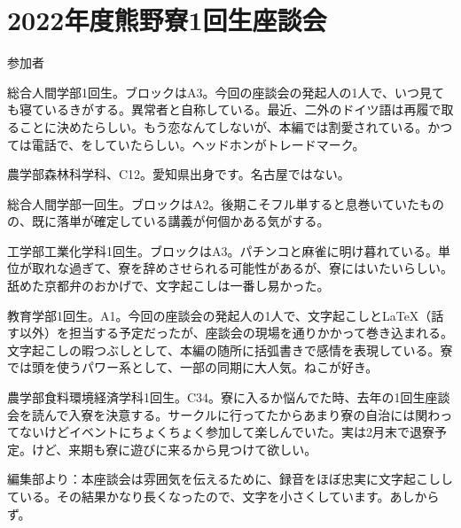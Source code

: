 


\section{2022年度熊野寮1回生座談会}\label{sec:ikkaisei}

\begin{itembox}[l]{{\Large 参加者}}

    総合人間学部1回生。ブロックはA3。今回の座談会の発起人の1人で、いつ見ても寝ているきがする。異常者と自称している。最近、二外のドイツ語は再履で取ることに決めたらしい。もう恋なんてしないが、本編では割愛されている。かつては電話で、をしていたらしい。ヘッドホンがトレードマーク。



    農学部森林科学科、C12。愛知県出身です。名古屋ではない。



    総合人間学部一回生。ブロックはA2。後期こそフル単すると息巻いていたものの、既に落単が確定している講義が何個かある気がする。



    工学部工業化学科1回生。ブロックはA3。パチンコと麻雀に明け暮れている。単位が取れな過ぎて、寮を辞めさせられる可能性があるが、寮にはいたいらしい。舐めた京都弁のおかげで、文字起こしは一番し易かった。



    教育学部1回生。A1。今回の座談会の発起人の1人で、文字起こしと\LaTeX （話す以外）を担当する予定だったが、座談会の現場を通りかかって巻き込まれる。文字起こしの暇つぶしとして、本編の随所に括弧書きで感情を表現している。寮では頭を使うパワー系として、一部の同期に大人気。ねこが好き。



    農学部食料環境経済学科1回生。C34。寮に入るか悩んでた時、去年の1回生座談会を読んで入寮を決意する。サークルに行ってたからあまり寮の自治には関わってないけどイベントにちょくちょく参加して楽しんでいた。実は2月末で退寮予定。けど、来期も寮に遊びに来るから見つけて欲しい。

\end{itembox}

\noindent 編集部より：本座談会は雰囲気を伝えるために、録音をほぼ忠実に文字起こししている。その結果かなり長くなったので、文字を小さくしています。あしからず。




